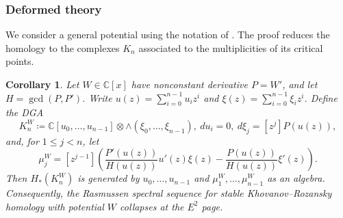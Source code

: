 \documentclass[reqno]{amsart}
\newtheorem{cor}[thm]{Corollary}
\theoremstyle{definition}
\theoremstyle{remark}
\begin{document}
\subsubsection{Deformed theory}

We consider a general potential using the notation of \cite[Section~7.2]{ballinger2025stable}. The proof reduces the homology to the complexes $K_n$ associated to the multiplicities of its critical points.

\begin{cor}\label{cor:deformed}
Let $W\in\mathbb C[x]$ have nonconstant derivative $P=W'$, and let $H=\gcd(P,P')$. Write $u(z)=\sum_{i=0}^{n-1}u_iz^i$ and $\xi(z)=\sum_{i=0}^{n-1}\xi_iz^i$. Define the DGA
\[K_n^W\coloneqq\mathbb C[u_0,\dots,u_{n-1}]\otimes\wedge(\xi_0,\dots,\xi_{n-1}),\ du_i=0,\ d\xi_j=[z^j]P(u(z)),\]
and, for $1\le j<n$, let
\[\mu_j^W=[z^{j-1}]\left(\frac{P'(u(z))}{H(u(z))}u'(z)\xi(z)-\frac{P(u(z))}{H(u(z))}\xi'(z)\right).\]
Then $H_*(K_n^W)$ is generated by $u_0,\dots,u_{n-1}$ and $\mu_1^W,\dots,\mu_{n-1}^W$ as an algebra. Consequently, the Rasmussen spectral sequence for stable Khovanov--Rozansky homology with potential $W$ collapses at the $E^2$ page.
\end{cor}
\end{document}
